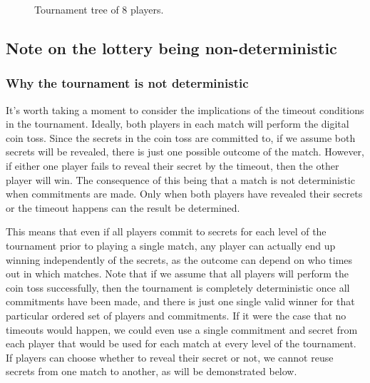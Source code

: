\begin{figure}[htbp]
  \centering
  
  \caption{Tournament tree of 8 players.}
  \label{fig:tournament-tree}
\end{figure}

\subsection{Note on the lottery being non-deterministic}

\subsubsection{Why the tournament is not deterministic}  %
It's worth taking a moment to consider the implications of the timeout conditions in the tournament. Ideally, both players in each match will perform the digital coin toss. Since the secrets in the coin toss are committed to, if we assume both secrets will be revealed, there is just one possible outcome of the match. However, if either one player fails to reveal their secret by the timeout, then the other player will win. The consequence of this being that a match is not deterministic when commitments are made. Only when both players have revealed their secrets or the timeout happens can the result be determined. 

This means that even if all players commit to secrets for each level of the tournament prior to playing a single match, any player can actually end up winning independently of the secrets, as the outcome can depend on who times out in which matches. Note that if we assume that all players will perform the coin toss successfully, then the tournament is completely deterministic once all commitments have been made, and there is just one single valid winner for that particular ordered set of players and commitments. If it were the case that no timeouts would happen, we could even use a single commitment and secret from each player that would be used for each match at every level of the tournament. If players can choose whether to reveal their secret or not, we cannot reuse secrets from one match to another, as will be demonstrated below.

